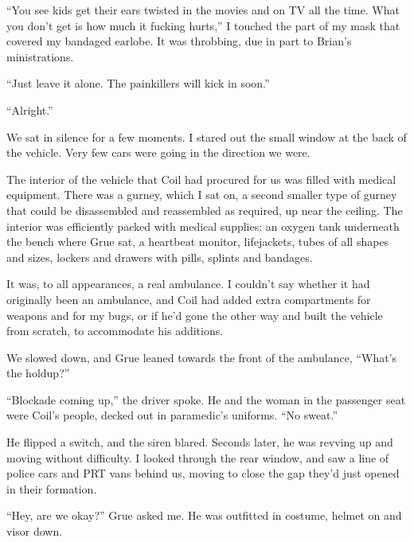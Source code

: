 \sectionbreak



``You see kids get their ears twisted in the movies and on TV all the time.  What you don't get is how much it fucking hurts,'' I touched the part of my mask that covered my bandaged earlobe.  It was throbbing, due in part to Brian's ministrations.



``Just leave it alone.  The painkillers will kick in soon.''



``Alright.''



We sat in silence for a few moments.  I stared out the small window at the back of the vehicle.  Very few cars were going in the direction we were.



The interior of the vehicle that Coil had procured for us was filled with medical equipment.  There was a gurney, which I sat on, a second smaller type of gurney that could be disassembled and reassembled as required, up near the ceiling.  The interior was efficiently packed with medical supplies: an oxygen tank underneath the bench where Grue sat, a heartbeat monitor, lifejackets, tubes of all shapes and sizes, lockers and drawers with pills, splints and bandages.



It was, to all appearances, a real ambulance.  I couldn't say whether it had originally been an ambulance, and Coil had added extra compartments for weapons and for my bugs, or if he'd gone the other way and built the vehicle from scratch, to accommodate his additions.



We slowed down, and Grue leaned towards the front of the ambulance,  ``What's the holdup?''



``Blockade coming up,'' the driver spoke.  He and the woman in the passenger seat were Coil's people, decked out in paramedic's uniforms.  ``No sweat.''



He flipped a switch, and the siren blared.  Seconds later, he was revving up and moving without difficulty.  I looked through the rear window, and saw a line of police cars and PRT vans behind us, moving to close the gap they'd just opened in their formation.



``Hey, are we okay?'' Grue asked me.  He was outfitted in costume, helmet on and visor down.



